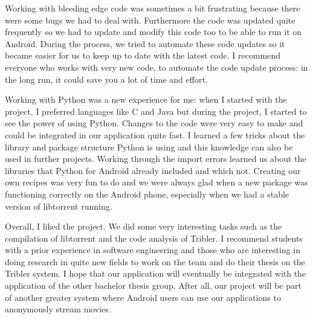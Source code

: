 		Working with bleeding edge code was sometimes a bit frustrating because there were some bugs we had to deal with. Furthermore the code was updated quite frequently so we had to update and modify this code too to be able to run it on Android. During the process, we tried to automate these code updates so it became easier for us to keep up to date with the latest code. I recommend everyone who works with very new code, to automate the code update process: in the long run, it could save you a lot of time and effort.
		
	  	Working with Python was a new experience for me: when I started with the project, I preferred languages like C and Java but during the project, I started to see the power of using Python. Changes to the code were very easy to make and could be integrated in our application quite fast. I learned a few tricks about the library and package structure Python is using and this knowledge can also be used in further projects. Working through the import errors learned us about the libraries that Python for Android already included and which not. Creating our own recipes was very fun to do and we were always glad when a new package was functioning correctly on the Android phone, especially when we had a stable version of libtorrent running.
	 	
	 	Overall, I liked the project. We did some very interesting tasks such as the compilation of libtorrent and the code analysis of Tribler. I recommend students with a prior experience in software engineering and those who are interesting in doing research in quite new fields to work on the team and do their thesis on the Tribler system. I hope that our application will eventually be integrated with the application of the other bachelor thesis group. After all, our project will be part of another greater system where Android users can use our applications to anonymously stream movies.
